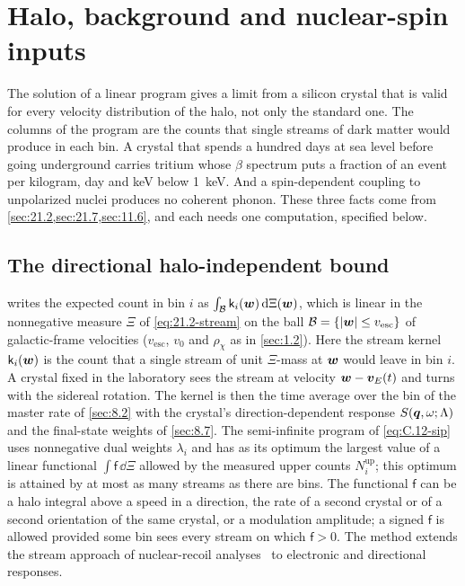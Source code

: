 \section{Halo, background and nuclear-spin inputs}\label{app:E.27}

The solution of a linear program gives a limit from a silicon crystal that is valid for every velocity distribution of the halo, not only the standard one. The columns of the program are the counts that single streams of dark matter would produce in each bin. A crystal that spends a hundred days at sea level before going underground carries tritium whose $\beta$ spectrum puts a fraction of an event per kilogram, day and keV below \SI{1}{keV}. And a spin-dependent coupling to unpolarized nuclei produces no coherent phonon. These three facts come from \cref{sec:21.2,sec:21.7,sec:11.6}, and each needs one computation, specified below.

\subsection{The directional halo-independent bound}

 writes the expected count in bin $i$ as $\int_{\mathcal{B}}\mathsf{k}_i(\bm{w})\,\mathrm{d}\Xi(\bm{w})$, which is linear in the nonnegative measure $\Xi$ of \cref{eq:21.2-stream} on the ball $\mathcal{B} = \{|\bm{w}| \le v_{\mathrm{esc}}\}$ of galactic-frame velocities ($v_{\mathrm{esc}}$, $v_0$ and $\rho_\chi$ as in \cref{sec:1.2}). Here the stream kernel $\mathsf{k}_i(\bm{w})$ is the count that a single stream of unit $\Xi$-mass at $\bm{w}$ would leave in bin $i$. A crystal fixed in the laboratory sees the stream at velocity $\bm{w} - \bm{v}_E(t)$ and turns with the sidereal rotation. The kernel is then the time average over the bin of the master rate of \cref{sec:8.2} with the crystal's direction-dependent response $S(\bm{q}, \omega; \Lambda)$ and the final-state weights of \cref{sec:8.7}. The semi-infinite program of \cref{eq:C.12-sip} uses nonnegative dual weights $\lambda_i$ and has as its optimum the largest value of a linear functional $\int\mathsf{f}\,\dd\Xi$ allowed by the measured upper counts $N_i^{\mathrm{up}}$; this optimum is attained by at most as many streams as there are bins. The functional $\mathsf{f}$ can be a halo integral above a speed in a direction, the rate of a second crystal or of a second orientation of the same crystal, or a modulation amplitude; a signed $\mathsf{f}$ is allowed provided some bin sees every stream on which $\mathsf{f} > 0$. The method extends the stream approach of nuclear-recoil analyses~\cite{feldstein2014new,ibarra2017optimized} to electronic and directional responses.

